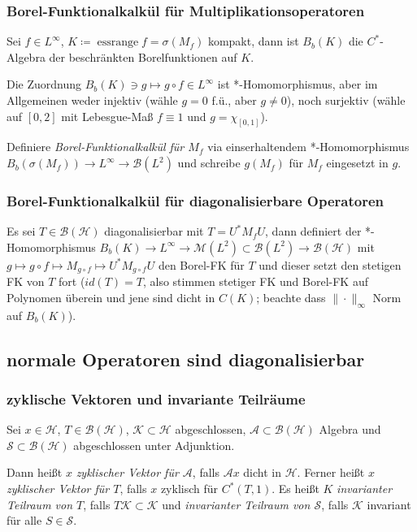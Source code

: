 \documentclass[11pt,a4paper]{scrartcl}
\newcommand{\Hc}{\mathcal{H}}
\newcommand{\Sc}{\mathcal{S}}
\newcommand{\Kc}{\mathcal{K}}
\newcommand{\A}{\mathcal{A}}
\newcommand{\B}{\mathcal{B}}
\newcommand{\M}{\mathcal{M}}
\theoremstyle{plain}
\theoremstyle{definition}
\theoremstyle{remark}
\DeclareMathOperator{\essrange}{ess range}
\begin{document}
\subsubsection{Borel-Funktionalkalkül für Multiplikationsoperatoren}

Sei $f\in L^\infty$, $K\coloneqq \essrange f = \sigma(M_f)$ kompakt, dann ist $B_b(K)$ die $C^*$-Algebra der beschränkten Borelfunktionen auf $K$. 

Die Zuordnung $B_b(K) \ni g \mapsto g\circ f \in L^\infty$ ist *-Homomorphismus, aber im Allgemeinen weder injektiv (wähle $g=0$ f.ü., aber $g\neq 0$), noch surjektiv (wähle auf $[0,2]$ mit Lebesgue-Maß $f\equiv 1$ und $g=\chi_{[0,1]}$).

Definiere \emph{Borel-Funktionalkalkül für $M_f$} via einserhaltendem *-Homomorphismus $B_b(\sigma(M_f)) \to L^\infty \to \B(L^2)$ und schreibe $g(M_f)$ für $M_f$ eingesetzt in $g$. 

\subsubsection{Borel-Funktionalkalkül für diagonalisierbare Operatoren}

Es sei $T\in \B(\Hc)$ diagonalisierbar mit $T=U^*M_f U$, dann definiert der *-Homomorphismus $B_b(K)\to L^\infty \to \M(L^2) \subset \B(L^2) \to \B(\Hc)$ mit $g\mapsto g\circ f \mapsto M_{g\circ f} \mapsto U^* M_{g\circ f} U$ den Borel-FK für $T$ und dieser setzt den stetigen FK von $T$ fort ($id(T)=T$, also stimmen stetiger FK und Borel-FK auf Polynomen überein und jene sind dicht in $C(K)$; beachte dass $\|\cdot\|_\infty$ Norm auf $B_b(K)$).

\subsection{normale Operatoren sind diagonalisierbar}

\subsubsection{zyklische Vektoren und invariante Teilräume}

Sei $x\in \Hc$, $T\in \B(\Hc)$, $\Kc \subset \Hc$ abgeschlossen, $\A \subset \B(\Hc)$ Algebra und $\Sc \subset \B(\Hc)$ abgeschlossen unter Adjunktion.

Dann heißt $x$ \emph{zyklischer Vektor für $\A$}, falls $\A x$ dicht in $\Hc$. Ferner heißt $x$ \emph{zyklischer Vektor für $T$}, falls $x$ zyklisch für $C^*(T,1)$. Es heißt $K$ \emph{invarianter Teilraum von $T$}, falls $T\Kc \subset \Kc$ und \emph{invarianter Teilraum von $\Sc$}, falls $\Kc$ invariant für alle $S\in \Sc$. 
\end{document}
